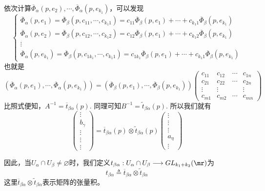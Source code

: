 依次计算$\overline{\varPhi}_{\alpha}(p,e_{2}),\cdots,\overline{\varPhi}_{\alpha}(p,e_{k_{1}})$，可以发现
\[
\left \{ \begin{array} { l } {\overline{\varPhi}_{\alpha}(p,e_{1})=\overline{\varPhi}_{\beta}(p,c_{11},\cdots,c_{k_{1}1})=c_{11}\overline{\varPhi}_{\beta}(p,e_{1})+\cdots+c_{k_{1}1}\overline{\varPhi}_{\beta}(p,e_{k_{1}}) } \\ { \overline{\varPhi}_{\alpha}(p,e_{2})=\overline{\varPhi}_{\beta}(p,c_{12},\cdots,c_{k_{1}2})=c_{12}\overline{\varPhi}_{\beta}(p,e_{1})+\cdots+c_{k_{1}2}\overline{\varPhi}_{\beta}(p,e_{k_{1}})  } \\{\vdots}\\ {  \overline{\varPhi}_{\alpha}(p,e_{k_{1}})=\overline{\varPhi}_{\beta}(p,c_{1k_{1}},\cdots,c_{k_{1}1})=c_{1k_{1}}\overline{\varPhi}_{\beta}(p,e_{1})+\cdots+c_{k_{1}1}\overline{\varPhi}_{\beta}(p,e_{k_{1}})  }\end{array} \right.
\]
也就是
\[
\left(\overline{\varPhi}_{\alpha}(p,e_{1}),\cdots,\overline{\varPhi}_{\alpha}(p,e_{k_{1}}) \right)=\left(\overline{\varPhi}_{\beta}(p,e_{1}),\cdots,\overline{\varPhi}_{\beta}(p,e_{k_{1}}) \right)\left( \begin{array}{cccc}{c_{11}} & {c_{12}} & {\cdots} & {c_{1 n}} \\ {c_{21}} & {c_{22}} & {\cdots} & {c_{2 n}} \\ {\vdots} & {\vdots} & { } & {\vdots} \\ {c_{m 1}} & {c_{m 2}} & {\cdots} & {c_{m n}}\end{array}\right)
\]
比照式便知，$A^{-1}=\overline{t}_{\beta\alpha}(p)$. 同理可知$B^{-1}=\tilde{t}_{\beta\alpha}(p)$. 所以我们就有
\[
\left( \begin{array}{ccccc}{\vdots} \\ {b_{\gamma}}  \\ {\vdots} \\ {\vdots}\\ {\vdots}\end{array}\right)=\overline{t}_{\beta\alpha}(p)\otimes \tilde{t}_{\beta\alpha}(p)\left( \begin{array}{ccccc}{\vdots} \\ {\vdots}  \\ {\vdots} \\ {a_{\eta}}\\ {\vdots}\end{array}\right)
\]

因此，当$U_{\alpha}\cap U_{\beta}\neq\varnothing$时，我们定义$t_{\beta\alpha}:U_{\alpha}\cap U_{\beta}\longrightarrow GL_{k_{1}+k_{2}}(\mr)$为
\begin{equation}
	t_{\beta\alpha}\triangleq\overline{t}_{\beta\alpha}\otimes \tilde{t}_{\beta\alpha}
\end{equation}
这里$\overline{t}_{\beta\alpha}\otimes \tilde{t}_{\beta\alpha}$表示矩阵的张量积。


